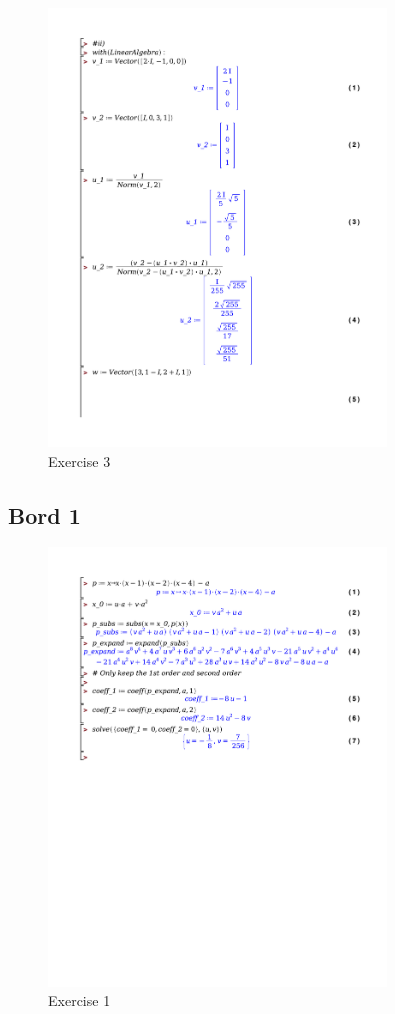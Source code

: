 \documentclass[a4paper]{article}
\begin{document}
\begin{figure}[!htbp]
	\centering
	\includegraphics[width=0.8\textwidth]{./exercises/wc_1_ex_3.pdf}
	\caption{Exercise 3}
\end{figure}

\newpage
\subsection*{Bord 1}

\begin{figure}[!htbp]
	\centering
	\includegraphics[width=0.8\textwidth]{./exercises/bordles_1.pdf}
	\caption{Exercise 1}
\end{figure}
\end{document}
